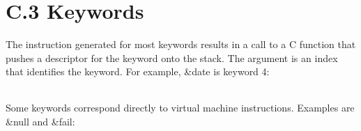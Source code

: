\section{C.3 Keywords}

The instruction generated for most keywords results in a call to a C
function that pushes a descriptor for the keyword onto the stack. The
argument is an index that identifies the keyword. For example, \&date
is keyword 4:

\begin{flushleft}
\tabletail{}
\tablelasttail{}
\begin{supertabular}{|m{1.9066598in}|m{2.75596in}|}

\end{supertabular}
\end{flushleft}

Some keywords correspond directly to virtual machine
instructions. Examples are \&null and \&fail:

\begin{flushleft}
\tabletail{}
\tablelasttail{}
\begin{supertabular}{|m{1.9066598in}|m{2.75596in}|}

\end{supertabular}
\end{flushleft}

\bigskip

\begin{flushleft}
\tabletail{}
\tablelasttail{}
\begin{supertabular}{|m{1.9066598in}|m{2.75596in}|}

\end{supertabular}
\end{flushleft}


